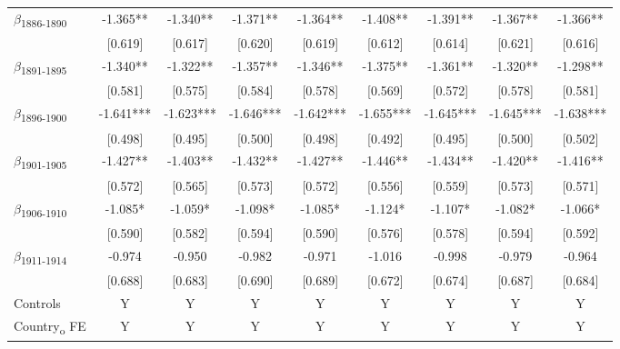 {\begin{tabular}{l*{8}{c}}
$\beta$\textsubscript{1886-1890}&      -1.365** &      -1.340** &      -1.371** &      -1.364** &      -1.408** &      -1.391** &      -1.367** &      -1.366** \\
            &     [0.619]   &     [0.617]   &     [0.620]   &     [0.619]   &     [0.612]   &     [0.614]   &     [0.621]   &     [0.616]   \\
$\beta$\textsubscript{1891-1895}&      -1.340** &      -1.322** &      -1.357** &      -1.346** &      -1.375** &      -1.361** &      -1.320** &      -1.298** \\
            &     [0.581]   &     [0.575]   &     [0.584]   &     [0.578]   &     [0.569]   &     [0.572]   &     [0.578]   &     [0.581]   \\
$\beta$\textsubscript{1896-1900}&      -1.641***&      -1.623***&      -1.646***&      -1.642***&      -1.655***&      -1.645***&      -1.645***&      -1.638***\\
            &     [0.498]   &     [0.495]   &     [0.500]   &     [0.498]   &     [0.492]   &     [0.495]   &     [0.500]   &     [0.502]   \\
$\beta$\textsubscript{1901-1905}&      -1.427** &      -1.403** &      -1.432** &      -1.427** &      -1.446** &      -1.434** &      -1.420** &      -1.416** \\
            &     [0.572]   &     [0.565]   &     [0.573]   &     [0.572]   &     [0.556]   &     [0.559]   &     [0.573]   &     [0.571]   \\
$\beta$\textsubscript{1906-1910}&      -1.085*  &      -1.059*  &      -1.098*  &      -1.085*  &      -1.124*  &      -1.107*  &      -1.082*  &      -1.066*  \\
            &     [0.590]   &     [0.582]   &     [0.594]   &     [0.590]   &     [0.576]   &     [0.578]   &     [0.594]   &     [0.592]   \\
$\beta$\textsubscript{1911-1914}&      -0.974   &      -0.950   &      -0.982   &      -0.971   &      -1.016   &      -0.998   &      -0.979   &      -0.964   \\
            &     [0.688]   &     [0.683]   &     [0.690]   &     [0.689]   &     [0.672]   &     [0.674]   &     [0.687]   &     [0.684]   \\
Controls    &           Y   &           Y   &           Y   &           Y   &           Y   &           Y   &           Y   &           Y   \\
Country\textsubscript{o} FE&           Y   &           Y   &           Y   &           Y   &           Y   &           Y   &           Y   &           Y   \\

\end{tabular}}
